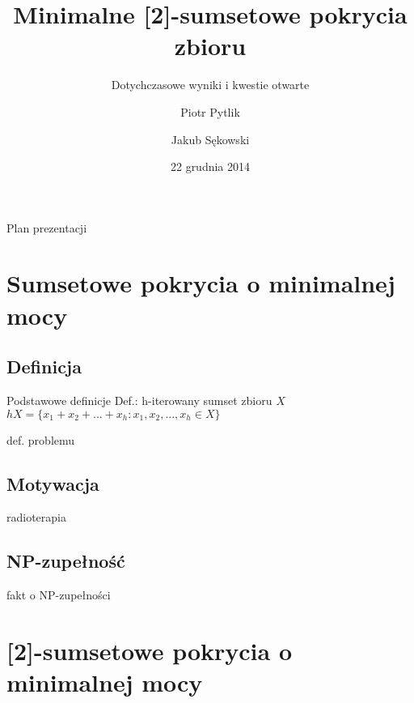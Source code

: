 \documentclass{beamer}
\begin{document}
\title{Minimalne [2]-sumsetowe pokrycia zbioru}
\subtitle{Dotychczasowe wyniki i kwestie otwarte}
\author[Piotr Pytlik \& Jakub Sękowski]{Piotr Pytlik \and Jakub Sękowski}
\date{22 grudnia 2014}

\begin{frame}
	\titlepage
\end{frame}

\begin{frame}{Plan prezentacji}
	\tableofcontents
\end{frame}

\section{Sumsetowe pokrycia o minimalnej mocy}
	\subsection{Definicja}
		\begin{frame}{Podstawowe definicje}
            Def.: h-iterowany sumset zbioru $ X $
            $ hX = \lbrace x_1 + x_2 + ... + x_h : x_1,x_2,...,x_h \in X \rbrace $
            
            \vspace{\baselineskip}
            
			def. problemu
		\end{frame}
		
	\subsection{Motywacja}
		\begin{frame}
			radioterapia
		\end{frame}	
			
	\subsection{NP-zupełność}
		\begin{frame}
			fakt o NP-zupełności
		\end{frame}
		
\section{[2]-sumsetowe pokrycia o minimalnej mocy}
\end{document}
